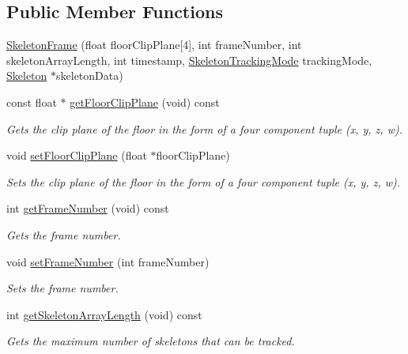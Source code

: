 \subsection*{\-Public \-Member \-Functions}
\begin{DoxyCompactItemize}
\item 
\hyperlink{class_skeleton_frame_a1ad4979b38d63f40e7ce495338e94033}{\-Skeleton\-Frame} (float floor\-Clip\-Plane\mbox{[}4\mbox{]}, int frame\-Number, int skeleton\-Array\-Length, int timestamp, \hyperlink{skeleton_tracking_mode_8h_a87402166ea87cd8993f36e03802e3742}{\-Skeleton\-Tracking\-Mode} tracking\-Mode, \hyperlink{class_skeleton}{\-Skeleton} $\ast$skeleton\-Data)
\item 
const float $\ast$ \hyperlink{class_skeleton_frame_a1945b555d0d3ed49264dc075f911443a}{get\-Floor\-Clip\-Plane} (void) const 
\begin{DoxyCompactList}\small\item\em \-Gets the clip plane of the floor in the form of a four component tuple (x, y, z, w). \end{DoxyCompactList}\item 
void \hyperlink{class_skeleton_frame_a149efe9c98cdee9de53c36bdfa70d1e3}{set\-Floor\-Clip\-Plane} (float $\ast$floor\-Clip\-Plane)
\begin{DoxyCompactList}\small\item\em \-Sets the clip plane of the floor in the form of a four component tuple (x, y, z, w). \end{DoxyCompactList}\item 
int \hyperlink{class_skeleton_frame_a798377f52f7576f61531c0a7056bfd50}{get\-Frame\-Number} (void) const 
\begin{DoxyCompactList}\small\item\em \-Gets the frame number. \end{DoxyCompactList}\item 
void \hyperlink{class_skeleton_frame_a32a7c688aefd9009c08541ff8df48b41}{set\-Frame\-Number} (int frame\-Number)
\begin{DoxyCompactList}\small\item\em \-Sets the frame number. \end{DoxyCompactList}\item 
int \hyperlink{class_skeleton_frame_a06b456ec4de73f9c2363bdb64eeb928f}{get\-Skeleton\-Array\-Length} (void) const 
\begin{DoxyCompactList}\small\item\em \-Gets the maximum number of skeletons that can be tracked. \end{DoxyCompactList}\item 

\end{DoxyCompactItemize}
